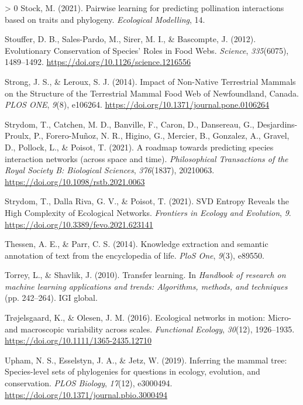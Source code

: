 \documentclass[10pt,oneside]{article}
\newlength{\cslhangindent}
\newenvironment{CSLReferences}[3] %
 {%
  \setlength{\parindent}{0pt}
  \ifodd #1 \everypar{\setlength{\hangindent}{\cslhangindent}}\ignorespaces\fi
  \ifnum #2 > 0
  \setlength{\parskip}{#2\baselineskip}
  \fi
 }%
 {}
\begin{document}
\begin{CSLReferences}{1}{0}
\leavevmode\hypertarget{ref-Stock2021PaiLea}{}%
Stock, M. (2021). Pairwise learning for predicting pollination
interactions based on traits and phylogeny. \emph{Ecological Modelling},
14.

\leavevmode\hypertarget{ref-Stouffer2012EvoCon}{}%
Stouffer, D. B., Sales-Pardo, M., Sirer, M. I., \& Bascompte, J. (2012).
Evolutionary Conservation of Species' Roles in Food Webs.
\emph{Science}, \emph{335}(6075), 1489--1492.
\url{https://doi.org/10.1126/science.1216556}

\leavevmode\hypertarget{ref-Strong2014ImpNon}{}%
Strong, J. S., \& Leroux, S. J. (2014). Impact of Non-Native Terrestrial
Mammals on the Structure of the Terrestrial Mammal Food Web of
Newfoundland, Canada. \emph{PLOS ONE}, \emph{9}(8), e106264.
\url{https://doi.org/10.1371/journal.pone.0106264}

\leavevmode\hypertarget{ref-Strydom2021RoaPre}{}%
Strydom, T., Catchen, M. D., Banville, F., Caron, D., Dansereau, G.,
Desjardins-Proulx, P., Forero-Muñoz, N. R., Higino, G., Mercier, B.,
Gonzalez, A., Gravel, D., Pollock, L., \& Poisot, T. (2021). A roadmap
towards predicting species interaction networks (across space and time).
\emph{Philosophical Transactions of the Royal Society B: Biological
Sciences}, \emph{376}(1837), 20210063.
\url{https://doi.org/10.1098/rstb.2021.0063}

\leavevmode\hypertarget{ref-Strydom2021SvdEnt}{}%
Strydom, T., Dalla Riva, G. V., \& Poisot, T. (2021). SVD Entropy
Reveals the High Complexity of Ecological Networks. \emph{Frontiers in
Ecology and Evolution}, \emph{9}.
\url{https://doi.org/10.3389/fevo.2021.623141}

\leavevmode\hypertarget{ref-Thessen2014KnoExt}{}%
Thessen, A. E., \& Parr, C. S. (2014). Knowledge extraction and semantic
annotation of text from the encyclopedia of life. \emph{PloS One},
\emph{9}(3), e89550.

\leavevmode\hypertarget{ref-Torrey2010TraLea}{}%
Torrey, L., \& Shavlik, J. (2010). Transfer learning. In \emph{Handbook
of research on machine learning applications and trends: Algorithms,
methods, and techniques} (pp. 242--264). IGI global.

\leavevmode\hypertarget{ref-Trojelsgaard2016EcoNet}{}%
Trøjelsgaard, K., \& Olesen, J. M. (2016). Ecological networks in
motion: Micro- and macroscopic variability across scales.
\emph{Functional Ecology}, \emph{30}(12), 1926--1935.
\url{https://doi.org/10.1111/1365-2435.12710}

\leavevmode\hypertarget{ref-Upham2019InfMam}{}%
Upham, N. S., Esselstyn, J. A., \& Jetz, W. (2019). Inferring the mammal
tree: Species-level sets of phylogenies for questions in ecology,
evolution, and conservation. \emph{PLOS Biology}, \emph{17}(12),
e3000494. \url{https://doi.org/10.1371/journal.pbio.3000494}


\end{CSLReferences}
\end{document}
